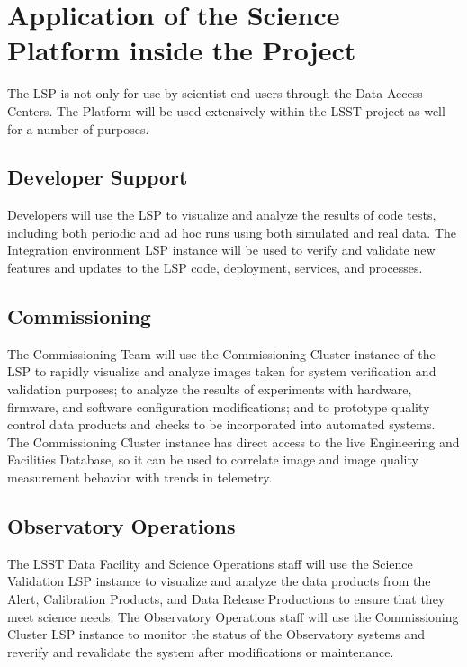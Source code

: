 \section{Application of the Science Platform inside the Project}\label{application-of-the-science-platform-inside-the-project}

The LSP is not only for use by scientist end users through the Data Access
Centers.  The Platform will be used extensively within the LSST project as well
for a number of purposes.

\subsection{Developer Support}\label{developer-support}

Developers will use the LSP to visualize and analyze the results of code tests,
including both periodic and ad hoc runs using both simulated and real data.
The Integration environment LSP instance will be used to verify and validate
new features and updates to the LSP code, deployment, services, and processes.

\subsection{Commissioning}\label{commissioning}

The Commissioning Team will use the Commissioning Cluster instance of the LSP
to rapidly visualize and analyze images taken for system verification and
validation purposes; to analyze the results of experiments with hardware,
firmware, and software configuration modifications; and to prototype quality
control data products and checks to be incorporated into automated systems.
The Commissioning Cluster instance has direct access to the live Engineering
and Facilities Database, so it can be used to correlate image and image
quality measurement behavior with trends in telemetry.

\subsection{Observatory Operations}\label{observatory-operations}

The LSST Data Facility and Science Operations staff will use the Science
Validation LSP instance to visualize and analyze the data products from the
Alert, Calibration Products, and Data Release Productions to ensure that they
meet science needs.  The Observatory Operations staff will use the
Commissioning Cluster LSP instance to monitor the status of the Observatory
systems and reverify and revalidate the system after modifications or
maintenance.
